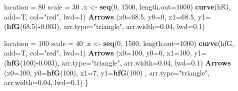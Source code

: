 \documentclass[12pt,oneside]{reedthesis}
\newenvironment{Shaded}{\begin{snugshade}}{\end{snugshade}}
\newcommand{\DataTypeTok}[1]{\textcolor[rgb]{0.13,0.29,0.53}{#1}}
\newcommand{\DecValTok}[1]{\textcolor[rgb]{0.00,0.00,0.81}{#1}}
\newcommand{\FloatTok}[1]{\textcolor[rgb]{0.00,0.00,0.81}{#1}}
\newcommand{\KeywordTok}[1]{\textcolor[rgb]{0.13,0.29,0.53}{\textbf{#1}}}
\newcommand{\NormalTok}[1]{#1}
\newcommand{\OperatorTok}[1]{\textcolor[rgb]{0.81,0.36,0.00}{\textbf{#1}}}
\newcommand{\StringTok}[1]{\textcolor[rgb]{0.31,0.60,0.02}{#1}}
\begin{document}
\begin{Shaded}
\begin{Highlighting}[]
\NormalTok{  location =}\StringTok{ }\DecValTok{80}
\NormalTok{  scale =}\StringTok{ }\DecValTok{30}
\NormalTok{  .x <-}\StringTok{ }\KeywordTok{seq}\NormalTok{(}\DecValTok{0}\NormalTok{, }\DecValTok{1500}\NormalTok{, }\DataTypeTok{length.out=}\DecValTok{1000}\NormalTok{)}
  \KeywordTok{curve}\NormalTok{(hfG, }\DataTypeTok{add=}\NormalTok{T, }\DataTypeTok{col=}\StringTok{"red"}\NormalTok{, }\DataTypeTok{lwd=}\DecValTok{1}\NormalTok{)}
  \KeywordTok{Arrows}\NormalTok{ (}\DataTypeTok{x0=}\FloatTok{68.5}\NormalTok{, }\DataTypeTok{y0=}\DecValTok{0}\NormalTok{, }\DataTypeTok{x1=}\FloatTok{68.5}\NormalTok{, }\DataTypeTok{y1=}\NormalTok{(}\KeywordTok{hfG}\NormalTok{(}\FloatTok{68.5}\NormalTok{)}\OperatorTok{-}\FloatTok{0.003}\NormalTok{), }\DataTypeTok{arr.type=}\StringTok{"triangle"}\NormalTok{, }\DataTypeTok{arr.width=}\FloatTok{0.04}\NormalTok{, }\DataTypeTok{lwd=}\FloatTok{0.1}\NormalTok{)}
  
\NormalTok{  location =}\StringTok{ }\DecValTok{100}
\NormalTok{  scale =}\StringTok{ }\DecValTok{40}
\NormalTok{  .x <-}\StringTok{ }\KeywordTok{seq}\NormalTok{(}\DecValTok{0}\NormalTok{, }\DecValTok{1500}\NormalTok{, }\DataTypeTok{length.out=}\DecValTok{1000}\NormalTok{)}
  \KeywordTok{curve}\NormalTok{(hfG, }\DataTypeTok{add=}\NormalTok{T, }\DataTypeTok{col=}\StringTok{"red"}\NormalTok{, }\DataTypeTok{lwd=}\DecValTok{1}\NormalTok{)}
  \KeywordTok{Arrows}\NormalTok{ (}\DataTypeTok{x0=}\DecValTok{100}\NormalTok{, }\DataTypeTok{y0=}\DecValTok{0}\NormalTok{, }\DataTypeTok{x1=}\DecValTok{100}\NormalTok{, }\DataTypeTok{y1=}\NormalTok{(}\KeywordTok{hfG}\NormalTok{(}\DecValTok{100}\NormalTok{)}\OperatorTok{-}\FloatTok{0.003}\NormalTok{), }\DataTypeTok{arr.type=}\StringTok{"triangle"}\NormalTok{, }\DataTypeTok{arr.width=}\FloatTok{0.04}\NormalTok{, }\DataTypeTok{lwd=}\FloatTok{0.1}\NormalTok{)}
  \KeywordTok{Arrows}\NormalTok{ (}\DataTypeTok{x0=}\DecValTok{100}\NormalTok{, }\DataTypeTok{y0=}\KeywordTok{hfG}\NormalTok{(}\DecValTok{100}\NormalTok{), }\DataTypeTok{x1=}\DecValTok{7}\NormalTok{, }\DataTypeTok{y1=}\KeywordTok{hfG}\NormalTok{(}\DecValTok{100}\NormalTok{) , }\DataTypeTok{arr.type=}\StringTok{"triangle"}\NormalTok{, }\DataTypeTok{arr.width=}\FloatTok{0.04}\NormalTok{, }\DataTypeTok{lwd=}\FloatTok{0.1}\NormalTok{)}
\NormalTok{\}}


\end{Highlighting}
\end{Shaded}
\end{document}
